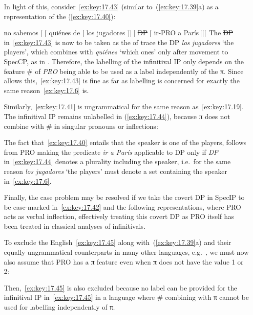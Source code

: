\documentclass[output=paper]{langsci/langscibook}
\begin{document}
In light of this, consider~\eqref{ex:key:17.43} (similar
to~(\ref{ex:key:17.39}a) as a representation of the 
(\ref{ex:key:17.40}):

\ea\label{ex:key:17.43}
    no sabemos\tss{\Fpl} [ [ quiénes de [  los jugadores ]] [ \sout{DP} [ ir-PRO\tss{\Fpl} a París ]]]
\z
The \sout{DP} in~\eqref{ex:key:17.43} is now to be taken as the of trace the DP
\emph{los jugadores} ‘the players’, which combines with \emph{quiénes} ‘which
ones’ only after movement to SpecCP, as in \citet{Sportiche2005}.  Therefore,
the labelling of the infinitival IP only depends on the feature
\# of \emph{PRO}\tss{\Fpl} being able to be used as a label independently of
the π. Since  allows this,~\eqref{ex:key:17.43} is fine as far as
labelling is concerned for exactly the same
reason~\eqref{ex:key:17.6} is.

Similarly,~\eqref{ex:key:17.41} is ungrammatical for the same reason
as~\eqref{ex:key:17.19}. The infinitival IP remains unlabelled in
(\ref{ex:key:17.44}), because π does not combine with \# in singular pronouns or
inflections:

\ea[*]{%
    no sé\tss{\Fsg} [\tss{CP} [\tss{whP} quién de [\tss{DP} los jugadores]]] [\tss{IP} \sout{DP} [\tss{IP} ir-PRO\tss{\Fsg} a París ]]]
    }\label{ex:key:17.44}
\z
The fact that~\eqref{ex:key:17.40} entails that the speaker is one of the players,
follows from PRO\tss{\Fpl} making the predicate \emph{ir a París}
applicable to DP only if \emph{DP} in~\eqref{ex:key:17.44} denotes a
plurality including the speaker, i.e.\ for the same reason \emph{los jugadores}
‘the players’ must denote a set containing the speaker in~\eqref{ex:key:17.6}.

Finally, the case problem may be resolved if we take the covert DP in SpecIP to
be case-marked in~\eqref{ex:key:17.42} and the following representations, where
PRO acts as verbal inflection, effectively treating this covert DP as PRO
itself has been treated in classical analyses of  infinitivals.

To exclude the English~\eqref{ex:key:17.45} along with~(\ref{ex:key:17.39}a) and their
equally ungrammatical counterparts in many other languages, e.g.\ , we
must now also assume that PRO has a π feature even when π
does not have the value 1 or 2:

\label{ex:key:17.45}
\z
Then,~\eqref{ex:key:17.45} is also excluded because no label can be provided for the
infinitival IP in~\eqref{ex:key:17.45} in a language where \# combining with π
cannot be used for labelling independently of π.
\end{document}
